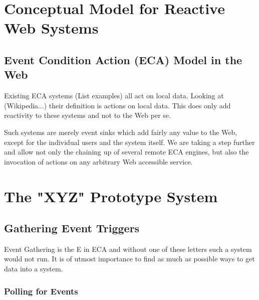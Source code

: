 \documentclass[11pt]{article}%
\begin{document}
\section{Conceptual Model for Reactive Web Systems}
%


\subsection{Event Condition Action (ECA) Model in the Web}
%

Existing ECA systems (List examples) all act on local data.
Looking at (Wikipedia...) their definition is actions on local data.
This does only add reactivity to these systems and not to the Web per se.

Such systems are merely event sinks which add fairly any value to the Web, except for the individual users and the system itself.
We are taking a step further and allow not only the chaining up of several remote ECA engines, but also the invocation of actions on any arbitrary Web accessible service.



\section{The "XYZ" Prototype System}
%



\subsection{Gathering Event Triggers}

Event Gathering is the E in ECA and without one of these letters such a system would not run.
It is of utmost importance to find as much as possible ways to get data into a system.



\subsubsection{Polling for Events}
\end{document}
